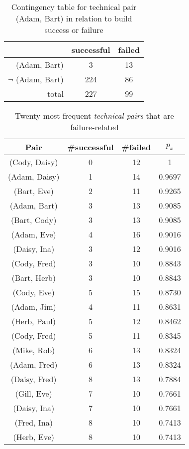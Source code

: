 \begin{table}[t]
\centering
\caption{Contingency table for technical pair (Adam, Bart) in relation to build
success or failure}
\begin{tabular}{rcc}
\toprule
 & successful & failed  \\
 \midrule
(Adam, Bart) & 3 & 13 \\
$\neg$ (Adam, Bart) & 224 & 86\\
\midrule
total&227&99\\\bottomrule
\end{tabular}
\label{tab:contingencytable}
\end{table}




\begin{table}[t]
\centering
\caption{Twenty most frequent \emph{technical pairs} that are failure-related}
\begin{tabular}{@{\hspace{.2cm}}ccc@{\hspace{.75cm}}c@{\hspace{.2cm}}}
\toprule
Pair & \#successful & \#failed & $p_x$\\
\midrule
(Cody, Daisy)	&	0&	12&	1		\\ %
(Adam, Daisy)	&	1&	14&	0.9697	\\ %
(Bart, Eve)	&	2&	11&	0.9265	\\ %
(Adam, Bart)	&	3&	13&	0.9085	\\ %
(Bart, Cody)	&	3&	13&	0.9085	\\ %
(Adam, Eve)	&	4&	16&	0.9016	\\ %
(Daisy, Ina)	&	3&	12&	0.9016	\\ %
(Cody, Fred)	&	3&	10&	0.8843	\\ %
(Bart, Herb)	&	3&	10&	0.8843	\\ %
(Cody, Eve)	&	5&	15&	0.8730	\\ %
(Adam, Jim)	&	4&	11&	0.8631	\\ %
(Herb, Paul)	&	5&	12&	0.8462	\\ %
(Cody, Fred)	&	5&	11&	0.8345	\\ %
(Mike, Rob)	&	6&	13&	0.8324	\\ %
(Adam, Fred)	&	6&	13&	0.8324	\\ %
(Daisy, Fred)	&	8&	13&	0.7884	\\ %
(Gill, Eve)		&	7&	10&	0.7661	\\ %
(Daisy, Ina)	&	7&	10&	0.7661	\\ %
(Fred, Ina)	&	8&	10&	0.7413	\\ %
(Herb, Eve)	&	8&	10&	0.7413	\\ %
\bottomrule
\end{tabular}
\label{tab:badtechpairs}
\end{table}
%

